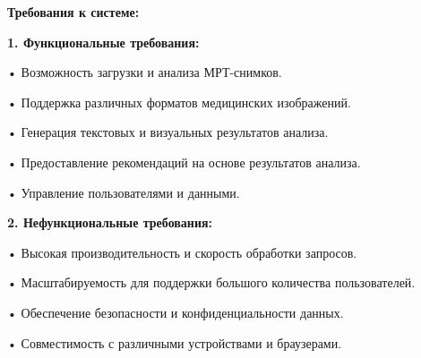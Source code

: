 {  \par \redline \textbf{Требования к системе:}

  \par \redline \textbf{1. Функциональные требования:}
  \par \redline \hspace{0.3cm} • Возможность загрузки и анализа МРТ-снимков.
  \par \redline \hspace{0.3cm} • Поддержка различных форматов медицинских изображений.
  \par \redline \hspace{0.3cm} • Генерация текстовых и визуальных результатов анализа.
  \par \redline \hspace{0.3cm} • Предоставление рекомендаций на основе результатов анализа.
  \par \redline \hspace{0.3cm} • Управление пользователями и данными.

  \par \redline \textbf{2. Нефункциональные требования:}
  \par \redline \hspace{0.3cm} • Высокая производительность и скорость обработки запросов.
  \par \redline \hspace{0.3cm} • Масштабируемость для поддержки большого количества пользователей.
  \par \redline \hspace{0.3cm} • Обеспечение безопасности и конфиденциальности данных.
  \par \redline \hspace{0.3cm} • Совместимость с различными устройствами и браузерами.


}
